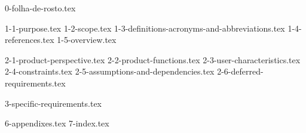 \documentclass[12pt,nodisplayskipstretch]{article}
\begin{document}
{0-folha-de-rosto.tex}

\newpage
\thispagestyle{empty}
\renewcommand{\contentsname}{\centering \normalsize \uppercase{SUMÁRIO}}
\tableofcontents
\clearpage

{1-1-purpose.tex}
{1-2-scope.tex}
{1-3-definitions-acronyms-and-abbreviations.tex}
{1-4-references.tex}
{1-5-overview.tex}

{2-1-product-perspective.tex}
{2-2-product-functions.tex}
{2-3-user-characteristics.tex}
{2-4-constraints.tex}
{2-5-assumptions-and-dependencies.tex}
{2-6-deferred-requirements.tex}

{3-specific-requirements.tex}


{6-appendixes.tex}
{7-index.tex}

\printglossaries
\end{document}
